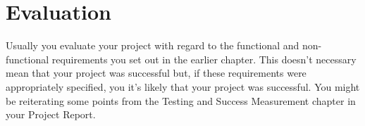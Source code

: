 
\chapter{Evaluation}

Usually you evaluate your project with regard to the functional and non-functional
requirements you set out in the earlier chapter. This doesn’t necessary mean that your project was
successful but, if these requirements were appropriately specified, you it’s likely that your project was
successful. You might be reiterating some points from the Testing and Success Measurement
chapter in your Project Report.

